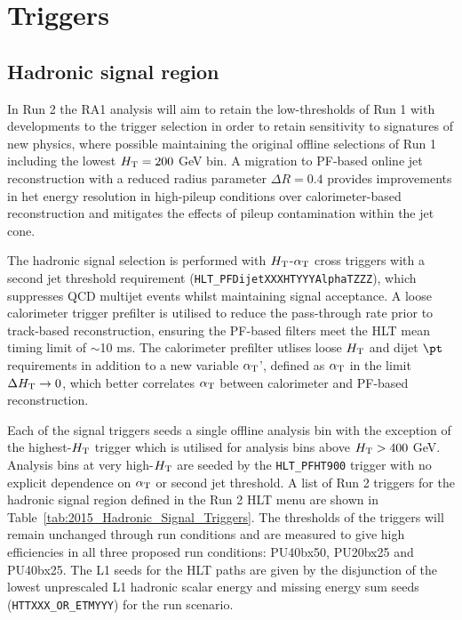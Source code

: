 \section{Triggers}
\label{sec:triggers}


\subsection{Hadronic signal region}


In Run 2 the RA1 analysis will aim to retain the low-thresholds of Run 1 with developments to the trigger selection in order to retain sensitivity to signatures of new physics, where possible maintaining the original offline selections of Run 1 including the lowest $\mbox{$H_\text{T}$} = 200$ GeV bin. A migration to PF-based online jet reconstruction with a reduced radius parameter $\Delta R = 0.4$ provides improvements in het energy resolution in high-pileup conditions over calorimeter-based reconstruction and mitigates the effects of pileup contamination within the jet cone.

The hadronic signal selection is performed with $\mbox{$H_\text{T}$}$-$\alpha_{\text{T}}$ cross triggers with a second jet threshold requirement (\verb!HLT_PFDijetXXXHTYYYAlphaTZZZ!), which suppresses QCD multijet events whilst maintaining signal acceptance.  A loose calorimeter trigger prefilter is utilised to reduce the pass-through rate prior to track-based reconstruction, ensuring the PF-based filters meet the HLT mean timing limit of $\sim$10 ms. The calorimeter prefilter utlises loose $\mbox{$H_\text{T}$}$ and dijet $\pt$ requirements in addition to a new variable $\alpha_{\text{T}}$', defined as $\alpha_{\text{T}}$ in the limit $\Delta\mbox{$H_\text{T}$} \rightarrow 0$, which better correlates $\alpha_{\text{T}}$ between calorimeter and PF-based reconstruction.

Each of the signal triggers seeds a single offline analysis bin with the exception of the highest-$\mbox{$H_\text{T}$}$ trigger which is utilised for analysis bins above $\mbox{$H_\text{T}$} > 400$ GeV. Analysis bins at very high-$\mbox{$H_\text{T}$}$ are seeded by the \verb!HLT_PFHT900! trigger with no explicit dependence on $\alpha_{\text{T}}$ or second jet threshold. A list of Run 2 triggers for the hadronic signal region defined in the Run 2 HLT menu are shown in Table~\ref{tab:2015_Hadronic_Signal_Triggers}. The thresholds of the triggers will remain unchanged through run conditions and are measured to give high efficiencies in all three proposed run conditions: PU40bx50, PU20bx25 and PU40bx25. The L1 seeds for the HLT paths are given by the disjunction of the lowest unprescaled L1 hadronic scalar energy and missing energy sum seeds (\verb!HTTXXX_OR_ETMYYY!) for the run scenario.


